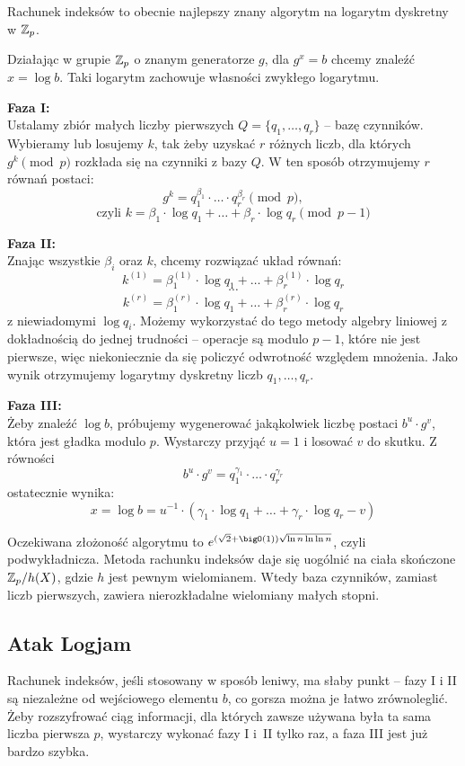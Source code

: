 Rachunek indeksów to obecnie najlepszy znany algorytm na logarytm dyskretny w \( \mathbb{Z}_p \).

Działając w grupie \( \mathbb{Z}_p \) o znanym generatorze \( g \), dla \( g^x = b \) chcemy znaleźć \( x = \log b \). Taki logarytm zachowuje własności zwykłego logarytmu.

\textbf{Faza I:} \\
Ustalamy zbiór małych liczby pierwszych \( Q = \{q_1, \dots, q_r\} \) -- bazę czynników.
Wybieramy lub losujemy \( k \), tak żeby uzyskać \( r \) różnych liczb, dla których \( g^k \pmod{p} \) rozkłada się na czynniki z bazy \( Q \). W ten sposób otrzymujemy \( r \) równań postaci:
\[
    g^k = q_1^{\beta_1} \cdot \ldots \cdot q_r^{\beta_r} \pmod{p},
\]
\[
    \text{czyli } k = \beta_1 \cdot \log q_1 + \ldots + \beta_r \cdot \log q_r \pmod{p - 1}
\]

\textbf{Faza II:} \\
Znając wszystkie \( \beta_i \) oraz \( k \), chcemy rozwiązać układ równań:
\[
    k^{(1)} = \beta_1^{(1)} \cdot \log q_1 + \ldots + \beta_r^{(1)} \cdot \log q_r
\]
\[
    \cdots
\]
\[
    k^{(r)} = \beta_1^{(r)} \cdot \log q_1 + \ldots + \beta_r^{(r)} \cdot \log q_r
\]
z niewiadomymi \( \log q_i \). Możemy wykorzystać do tego metody algebry liniowej z dokładnością do jednej trudności -- operacje są modulo \( p-1 \), które nie jest pierwsze, więc niekoniecznie da się policzyć odwrotność względem mnożenia.
Jako wynik otrzymujemy logarytmy dyskretny liczb \( q_1, \dots, q_r \).

\textbf{Faza III:} \\
Żeby znaleźć \( \log b \), próbujemy wygenerować jakąkolwiek liczbę postaci \( b^u \cdot g^v \), która jest gładka modulo \( p \). Wystarczy przyjąć \( u = 1 \) i losować \( v \) do skutku. Z równości
\[ b^u \cdot g^v = q_1^{\gamma_1} \cdot \ldots \cdot q_r^{\gamma_r} \]
ostatecznie wynika:
\[ x = \log b = u^{-1} \cdot (\gamma_1 \cdot \log q_1 + \ldots + \gamma_r \cdot \log q_r - v) \]

Oczekiwana złożoność algorytmu to \( e^{(\sqrt{2}+\bigO(1))\sqrt{\ln n \ln\ln n}} \), czyli podwykładnicza. Metoda rachunku indeksów daje się uogólnić na ciała skończone \( \mathbb{Z}_p/h(X) \), gdzie \( h \) jest pewnym wielomianem. Wtedy baza czynników, zamiast liczb pierwszych, zawiera nierozkładalne wielomiany małych stopni.

\subsection{Atak Logjam}
Rachunek indeksów, jeśli stosowany w sposób leniwy, ma słaby punkt -- fazy I i II są niezależne od wejściowego elementu \( b \), co gorsza można je łatwo zrównoleglić.
Żeby rozszyfrować ciąg informacji, dla których zawsze używana była ta sama liczba pierwsza \( p \), wystarczy wykonać fazy I i~II tylko raz, a faza III jest już bardzo szybka.
